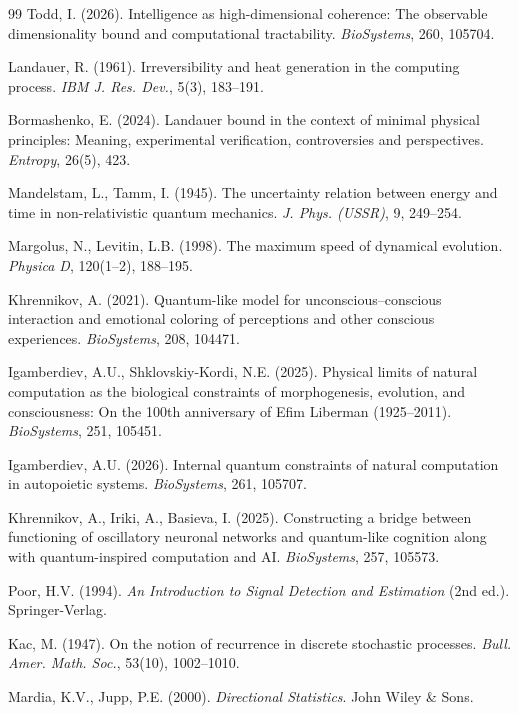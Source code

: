 \documentclass[12pt]{article}
\begin{document}
\begin{thebibliography}{99}
Todd, I. (2026). Intelligence as high-dimensional coherence: The observable dimensionality bound and computational tractability. \textit{BioSystems}, 260, 105704.

Landauer, R. (1961). Irreversibility and heat generation in the computing process. \textit{IBM J. Res. Dev.}, 5(3), 183--191.

Bormashenko, E. (2024). Landauer bound in the context of minimal physical principles: Meaning, experimental verification, controversies and perspectives. \textit{Entropy}, 26(5), 423.

Mandelstam, L., Tamm, I. (1945). The uncertainty relation between energy and time in non-relativistic quantum mechanics. \textit{J. Phys. (USSR)}, 9, 249--254.

Margolus, N., Levitin, L.B. (1998). The maximum speed of dynamical evolution. \textit{Physica D}, 120(1--2), 188--195.

Khrennikov, A. (2021). Quantum-like model for unconscious--conscious interaction and emotional coloring of perceptions and other conscious experiences. \textit{BioSystems}, 208, 104471.

Igamberdiev, A.U., Shklovskiy-Kordi, N.E. (2025). Physical limits of natural computation as the biological constraints of morphogenesis, evolution, and consciousness: On the 100th anniversary of Efim Liberman (1925--2011). \textit{BioSystems}, 251, 105451.

Igamberdiev, A.U. (2026). Internal quantum constraints of natural computation in autopoietic systems. \textit{BioSystems}, 261, 105707.

Khrennikov, A., Iriki, A., Basieva, I. (2025). Constructing a bridge between functioning of oscillatory neuronal networks and quantum-like cognition along with quantum-inspired computation and AI. \textit{BioSystems}, 257, 105573.

Poor, H.V. (1994). \textit{An Introduction to Signal Detection and Estimation} (2nd ed.). Springer-Verlag.

Kac, M. (1947). On the notion of recurrence in discrete stochastic processes. \textit{Bull. Amer. Math. Soc.}, 53(10), 1002--1010.

Mardia, K.V., Jupp, P.E. (2000). \textit{Directional Statistics}. John Wiley \& Sons.


\end{thebibliography}
\end{document}
